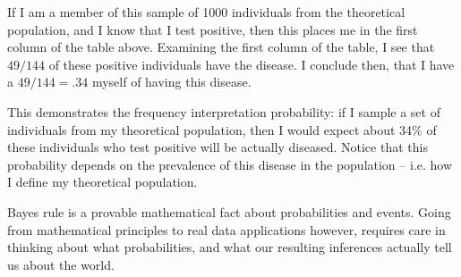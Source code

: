 \documentclass[11pt]{article}
\theoremstyle{definition}
\begin{document}
If I am a member of this sample of 1000 individuals
from the theoretical population, and I know that
I test positive, then this places me in the first
column of the table above.
Examining the first column of the table, I see
that $49 / 144$ of these positive individuals
have the disease. I conclude then,
that I have a $49 / 144 = .34$ myself
of having this disease.

This demonstrates the frequency interpretation
probability: if I sample a set of
individuals from my theoretical population,
then I would expect
about 34\% of these individuals who test
positive will be actually diseased.
Notice that this probability depends on the
prevalence of this disease in the population -- i.e.
how I define my theoretical population.

Bayes rule is a provable mathematical fact about
probabilities and events.
Going from mathematical principles to real data
applications however, requires care in
thinking about what probabilities, and what our resulting
inferences actually tell us about the world.
\end{document}
